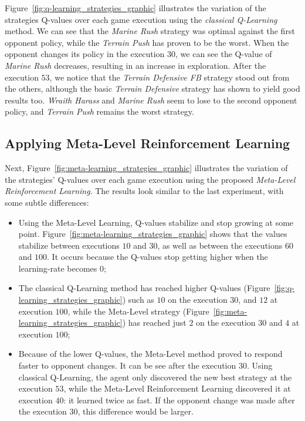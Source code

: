 Figure~\ref{fig:q-learning_strategies_graphic} illustrates the variation of the strategies Q-values over each game execution using the \textit{classical Q-Learning} method.
We can see that the \textit{Marine Rush} strategy was optimal against the first opponent policy, 
while the \textit{Terrain Push} has proven to be the worst.
When the opponent changes its policy in the execution $30$, we can see the Q-value of \textit{Marine Rush} decreases,
resulting in an increase in exploration. 
After the execution $53$, we notice that the \textit{Terrain Defensive FB} strategy stood out from the others, although the basic \textit{Terrain Defensive} strategy has shown to yield good results too. 
\textit{Wraith Harass} and \textit{Marine Rush} seem to lose to the second opponent policy, 
and \textit{Terrain Push} remains the worst strategy. 



\subsection{Applying Meta-Level Reinforcement Learning}
\label{subsec:applying_mlrl}

Next, Figure~\ref{fig:meta-learning_strategies_graphic} illustrates the variation of the strategies' Q-values over each game execution using the proposed \textit{Meta-Level Reinforcement Learning}.
The results look similar to the last experiment, with some subtle differences: 

\begin{itemize}
\item Using the Meta-Level Learning, Q-values stabilize and stop growing at some point. Figure~\ref{fig:meta-learning_strategies_graphic} shows that the values stabilize between executions $10$ and $30$, as well as between the executions $60$ and $100$. It occurs because the Q-values stop getting higher when the learning-rate becomes $0$;

\item The classical Q-Learning method has reached higher Q-values (Figure~\ref{fig:q-learning_strategies_graphic}) such as $10$ on the execution $30$, and $12$ at execution $100$, while the Meta-Level strategy (Figure~\ref{fig:meta-learning_strategies_graphic}) has reached just $2$ on the execution $30$ and $4$ at execution $100$;

\item Because of the lower Q-values, the Meta-Level method proved to respond faster to opponent changes. It can be see after the execution $30$. Using classical Q-Learning, the agent only discovered the new best strategy at the execution $53$, while the Meta-Level Reinforcement Learning discovered it at execution $40$: it learned twice as fast. If the opponent change was made after the execution $30$, this difference would be larger.
\end{itemize}

